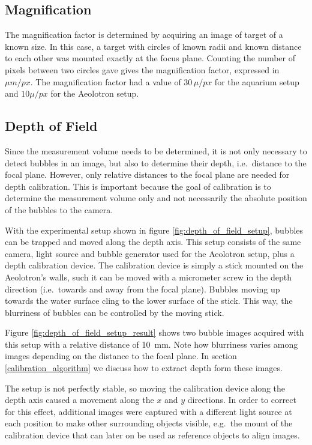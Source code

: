 		\subsection{Magnification}\label{sub:magnification}
			The magnification factor is determined by acquiring an image of target of a known size. In this case, a target with circles of known radii and known distance to each other was mounted exactly at the focus plane. Counting the number of pixels between two circles gave gives the magnification factor, expressed in $\mu m/px$. The magnification factor had a value of $30\, \mu / px$ for the aquarium setup and $10 \mu / px$ for the Aeolotron setup. 
		\subsection{Depth of Field}\label{sub:depth_of_field_setup}
			Since the measurement volume needs to be determined, it is not only necessary to detect bubbles in an image, but also to determine their depth, i.e.\ distance to the focal plane. However, only relative distances to the focal plane are needed for depth calibration. This is important because the goal of calibration is to determine the measurement volume only and not necessarily the absolute position of the bubbles to the camera. 
			
			With the experimental setup shown in figure \ref{fig:depth_of_field_setup}, bubbles can be trapped and moved along the depth axis. This setup consists of the same camera, light source and bubble generator used for the Aeolotron setup, plus a depth calibration device. The calibration device is simply a stick mounted on the Aeolotron's walls, such it can be moved with a micrometer screw in the depth direction (i.e.\ towards and away from the focal plane). Bubbles moving up towards the water surface cling to the lower surface of the stick. This way, the blurriness of bubbles can be controlled by the moving stick.  
			
			Figure \ref{fig:depth_of_field_setup_result} shows two bubble images acquired with this setup with a relative distance of 10\, mm. Note how blurriness varies among images depending on the distance to the focal plane. In section \ref{calibration_algorithm} we discuss how to extract depth form these images. 
			
			The setup is not perfectly stable, so moving the calibration device along the depth axis caused a movement along the $x$ and $y$ directions. In order to correct for this effect, additional images were captured with a different light source at each position to make other surrounding objects visible, e.g.\ the mount of the calibration device that can later on be used as reference objects to align images.  
			
